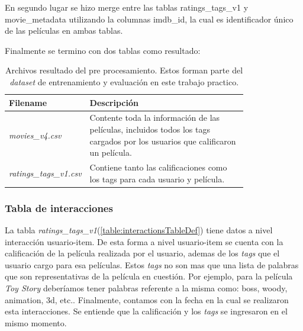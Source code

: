 \documentclass[11pt,a4paper,twoside]{thesis}
\begin{document}
En segundo lugar se hizo merge entre las tablas ratings\_tags\_v1 y movie\_metadata utilizando la columnas imdb\_id, la cual es identificador único de las películas en ambas tablas.

Finalmente se termino con dos tablas como resultado:


\begin{table}[!htb]
	\centering
	\footnotesize
	\begin{tabular}{l | p{0.8\linewidth}}
	\hline
		Filename            & Descripción \\
	\hline
	\textit{movies\_v4.csv} & Contente toda la información de las películas, incluidos todos los tags cargados por los usuarios que calificaron un película. \\
	\textit{ratings\_tags\_v1.csv} & Contiene tanto las calificaciones como los tags para cada usuario y película. \\
	\hline
	\end{tabular}
	\caption{
		Archivos resultado del pre procesamiento. Estos forman parte del \textit{dataset} de entrenamiento y evaluación en este trabajo practico.
	}
	\label{table:tableFiles}
\end{table}

\subsubsection{Tabla de interacciones}

La tabla \textit{ratings\_tags\_v1}(\ref{table:interactionsTableDef}) tiene datos a nivel interacción usuario-item. De esta forma a nivel usuario-item se cuenta con la calificación de la película realizada por el usuario, ademas de los \textit{tags} que el usuario cargo para esa películas. Estos \textit{tags} no son mas que una lista de palabras que son representativas de la película en cuestión. 
Por ejemplo, para la película \textit{Toy Story} deberíamos tener palabras referente a la misma como: boss, woody, 
animation, 3d, etc.. Finalmente, contamos con la fecha en la cual se realizaron esta interacciones. Se entiende 
que la calificación y los \textit{tags} se ingresaron en el mismo momento.
\end{document}
